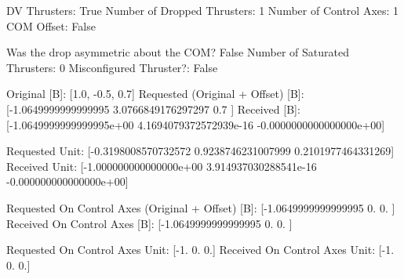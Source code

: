 DV Thrusters:	True
Number of Dropped Thrusters:	1
Number of Control Axes:	1
COM Offset:	False

Was the drop asymmetric about the COM?	False
Number of Saturated Thrusters:	0
Misconfigured Thruster?:	False

Original [B]:	[1.0, -0.5, 0.7]
Requested (Original + Offset) [B]:	[-1.0649999999999995  3.0766849176297297  0.7               ]
Received [B]:		[-1.0649999999999995e+00  4.1694079372572939e-16 -0.0000000000000000e+00]

Requested Unit:		[-0.3198008570732572  0.9238746231007999  0.2101977464331269]
Received Unit:		[-1.000000000000000e+00  3.914937030288541e-16 -0.000000000000000e+00]

Requested On Control Axes (Original + Offset) [B]:	[-1.0649999999999995  0.                  0.                ]
Received On Control Axes [B]:		[-1.0649999999999995  0.                  0.                ]

Requested On Control Axes Unit:		[-1.  0.  0.]
Received On Control Axes Unit:		[-1.  0.  0.]

